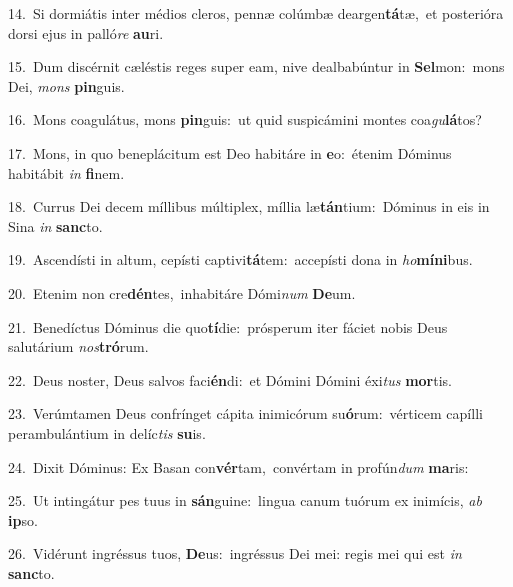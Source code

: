 {\numbfont\textcolor{\numbcolor}{14.}}~Si dormiátis inter médios cleros, pennæ colúmbæ deargen\-\textbf{tá}\-tæ,~\star et posterióra dorsi ejus in palló\textit{re} \textbf{au}\-ri.\par
{\numbfont\textcolor{\numbcolor}{15.}}~Dum discérnit cæléstis reges super eam, nive dealbabúntur in \textbf{Sel}\-mon:~\star mons Dei, \textit{mons} \textbf{pin}\-guis.\par
{\numbfont\textcolor{\numbcolor}{16.}}~Mons coagulátus, mons \textbf{pin}\-guis:~\star ut quid suspicámini montes coa\-\textit{gu}\-\textbf{lá}tos?\par
{\numbfont\textcolor{\numbcolor}{17.}}~Mons, in quo beneplácitum est Deo habitáre in \textbf{e}\-o:~\star étenim Dóminus habitábit \textit{in} \textbf{fi}\-nem.\par
{\numbfont\textcolor{\numbcolor}{18.}}~Currus Dei decem míllibus múltiplex, míllia læ\-\textbf{tán}\-tium:~\star Dóminus in eis in Sina \textit{in} \textbf{sanc}\-to.\par
{\numbfont\textcolor{\numbcolor}{19.}}~Ascendísti in altum, cepísti captivi\-\textbf{tá}\-tem:~\star accepísti dona in \textit{ho}\-\textbf{mí}\textbf{ni}bus.\par
{\numbfont\textcolor{\numbcolor}{20.}}~Etenim non cre\-\textbf{dén}\-tes,~\star inhabitáre Dómi\textit{num} \textbf{De}\-um.\par
{\numbfont\textcolor{\numbcolor}{21.}}~Benedíctus Dóminus die quo\-\textbf{tí}\-die:~\star prósperum iter fáciet nobis Deus salutárium \textit{nos}\-\textbf{tró}rum.\par
{\numbfont\textcolor{\numbcolor}{22.}}~Deus noster, Deus salvos faci\-\textbf{én}\-di:~\star et Dómini Dómini éxi\textit{tus} \textbf{mor}\-tis.\par
{\numbfont\textcolor{\numbcolor}{23.}}~Verúmtamen Deus confrínget cápita inimicórum su\-\textbf{ó}\-rum:~\star vérticem capílli perambulántium in delíc\textit{tis} \textbf{su}\-is.\par
{\numbfont\textcolor{\numbcolor}{24.}}~Dixit Dóminus: Ex Basan con\-\textbf{vér}\-tam,~\star convértam in profún\textit{dum} \textbf{ma}\-ris:\par
{\numbfont\textcolor{\numbcolor}{25.}}~Ut intingátur pes tuus in \textbf{sán}\-guine:~\star lingua canum tuórum ex inimícis, \textit{ab} \textbf{ip}\-so.\par
{\numbfont\textcolor{\numbcolor}{26.}}~Vidérunt ingréssus tuos, \textbf{De}\-us:~\star ingréssus Dei mei: regis mei qui est \textit{in} \textbf{sanc}\-to.\par
